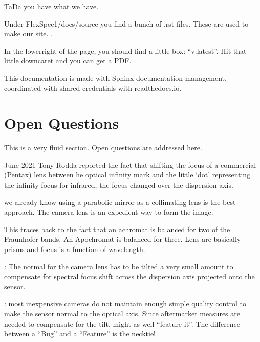 \documentclass[letterpaper,10pt,english,openany,oneside]{sphinxmanual}
\begin{document}
\sphinxAtStartPar
TaDa you have what we have.

\sphinxAtStartPar
{}

\sphinxAtStartPar
Under FlexSpec1/docs/source you find a bunch of .rst files. These
are used to make our 
site. .

\sphinxAtStartPar
In the lower\sphinxhyphen{}right of the page, you should find a little box:
“v:latest”. Hit that little down\sphinxhyphen{}caret and you can get a PDF.

\sphinxAtStartPar
This documentation is made with Sphinx documentation management, coordinated
with shared credentials with readthedocs.io.


\chapter{Open Questions}
\label{\detokenize{openquestions:open-questions}}\label{\detokenize{openquestions::doc}}
\sphinxAtStartPar
This is a very fluid section. Open questions are addressed here.

 June 2021 Tony Rodda reported the fact that shifting the focus of
a commercial (Pentax) lens between he optical infinity mark and the
little ‘dot’ representing the infinity focus for infrared, the focus
changed over the dispersion axis.

\sphinxAtStartPar
{} we already know using a parabolic mirror as
a collimating lens is the best approach. The camera lens is
an expedient way to form the image.

\sphinxAtStartPar
This traces back to the fact that an achromat is balanced for two
of the Fraunhofer bands. An Apochromat is balanced for three. Lens
are basically prisms and focus is a function of wavelength.

\sphinxAtStartPar
{}: The normal for the camera lens has to be tilted
a very small amount to compensate for spectral focus shift across
the dispersion axis projected onto the sensor.

\sphinxAtStartPar
{}: most inexpensive cameras do not maintain enough simple
quality control to make the sensor normal to the optical axis. Since
after\sphinxhyphen{}market measures are needed to compensate for the tilt, might
as well “feature it”. The difference between a “Bug” and a “Feature”
is the necktie!
\end{document}

